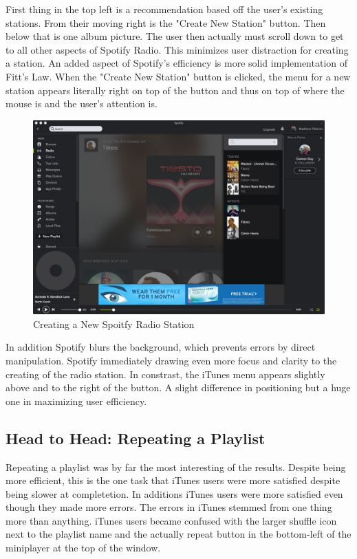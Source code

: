\documentclass[a4paper]{article}
\begin{document}
First thing in the top left is a recommendation based off the user's existing stations. From their moving right is the "Create New Station" button. Then below that is one album picture. The user then actually must scroll down to get to all other aspects of Spotify Radio. This minimizes user distraction for creating a station. An added aspect of Spotify's efficiency is more solid implementation of Fitt's Law. When the "Create New Station" button is clicked, the menu for a new station appears literally right on top of the button and thus on top of where the mouse is and the user's attention is.

\begin{figure}[H]
\centering
\includegraphics[width=.6\textwidth]{spotifyradio2.jpg}
\caption{\label{heuristic: spotifyRadio2} Creating a New Spoitfy Radio Station}
\end{figure}

In addition Spotify blurs the background, which prevents errors by direct manipulation. Spotify immediately drawing even more focus and clarity to the creating of the radio station. In constrast, the iTunes menu appears slightly above and to the right of the button. A slight difference in positioning but a huge one in maximizing user efficiency. 

\subsection{Head to Head: Repeating a Playlist}
Repeating a playlist was by far the most interesting of the results. Despite being more efficient, this is the one task that iTunes users were more satisfied despite being slower at completetion. In additions iTunes users were more satisfied even though they made more errors. The errors in iTunes stemmed from one thing more than anything. iTunes users became confused with the larger shuffle icon next to the playlist name and the actually repeat button in the bottom-left of the miniplayer at the top of the window. 
\end{document}
